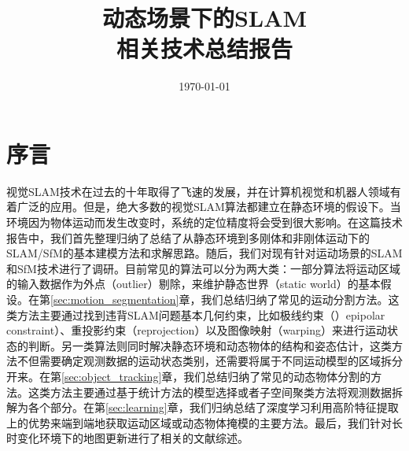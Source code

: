 \documentclass[11pt,a4paper,UTF8]{zhalabReport}
\title{\fontsize{40}{60}\selectfont 动态场景下的SLAM\\相关技术总结报告}
\date{\chdate\today}
\begin{document}

\maketitle

\tableofcontents
\section{序言}
\label{sec:preliminaries}
视觉SLAM技术在过去的十年取得了飞速的发展，并在计算机视觉和机器人领域有着广泛的应用。但是，绝大多数的视觉SLAM算法都建立在静态环境的假设下。当环境因为物体运动而发生改变时，系统的定位精度将会受到很大影响。在这篇技术报告中，我们首先整理归纳了总结了从静态环境到多刚体和非刚体运动下的SLAM/SfM的基本建模方法和求解思路。随后，我们对现有针对运动场景的SLAM和SfM技术进行了调研。目前常见的算法可以分为两大类：一部分算法将运动区域的输入数据作为外点（outlier）剔除，来维护静态世界（static world）的基本假设。在第\ref{sec:motion_segmentation}章，我们总结归纳了常见的运动分割方法。这类方法主要通过找到违背SLAM问题基本几何约束，比如极线约束（）epipolar constraint）、重投影约束（reprojection）以及图像映射（warping）来进行运动状态的判断。另一类算法则同时解决静态环境和动态物体的结构和姿态估计，这类方法不但需要确定观测数据的运动状态类别，还需要将属于不同运动模型的区域拆分开来。在第\ref{sec:object_tracking}章，我们总结归纳了常见的动态物体分割的方法。这类方法主要通过基于统计方法的模型选择或者子空间聚类方法将观测数据拆解为各个部分。在第\ref{sec:learning}章，我们归纳总结了深度学习利用高阶特征提取上的优势来端到端地获取运动区域或动态物体掩模的主要方法。最后，我们针对长时变化环境下的地图更新进行了相关的文献综述。
%
%
%
%




	
\end{document}
